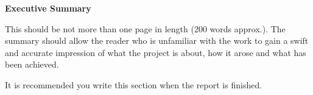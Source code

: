 
\clearpage


\vspace*{-0.15cm} 
{\centering
    {\fontsize{16pt}{20pt}\selectfont \textbf{Executive Summary} \par}
}
\vspace{0.5cm}

\noindent
This should be not more than one page in length (200 words approx.). The summary should allow the reader who is unfamiliar with the work to gain a swift and accurate impression of what the project is about, how it arose and what has been achieved.  

It is recommended you write this section when the report is finished.
